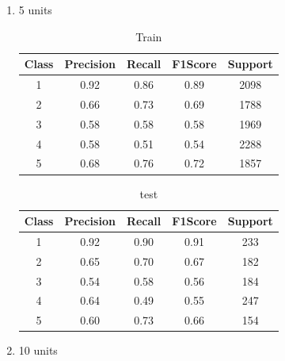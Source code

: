 \begin{enumerate}[label=(\alph*)]
\begin{enumerate}[label=\roman*.]
\begin{table}[!htb]
                    \end{table}
              \item 5 units
                    \begin{table}[!htb]
                        \centering
                        \begin{tabular}{ccccc}
                            \hline
                            Class & Precision & Recall & F1Score & Support \\ \hline
                            1     & 0.92      & 0.86   & 0.89    & 2098    \\
                            2     & 0.66      & 0.73   & 0.69    & 1788    \\
                            3     & 0.58      & 0.58   & 0.58    & 1969    \\
                            4     & 0.58      & 0.51   & 0.54    & 2288    \\
                            5     & 0.68      & 0.76   & 0.72    & 1857    \\ \hline
                        \end{tabular}
                        \caption{Train}
                        \label{part b train depth 5}
                    \end{table}
                    \begin{table}[!htb]
                        \centering
                        \begin{tabular}{ccccc}
                            \hline
                            Class & Precision & Recall & F1Score & Support \\ \hline
                            1     & 0.92      & 0.90   & 0.91    & 233     \\
                            2     & 0.65      & 0.70   & 0.67    & 182     \\
                            3     & 0.54      & 0.58   & 0.56    & 184     \\
                            4     & 0.64      & 0.49   & 0.55    & 247     \\
                            5     & 0.60      & 0.73   & 0.66    & 154     \\ \hline
                        \end{tabular}
                        \caption{test}
                        \label{part b test depth 5}
                    \end{table}
                    \newpage
              \item 10 units

\end{enumerate}
\end{enumerate}
